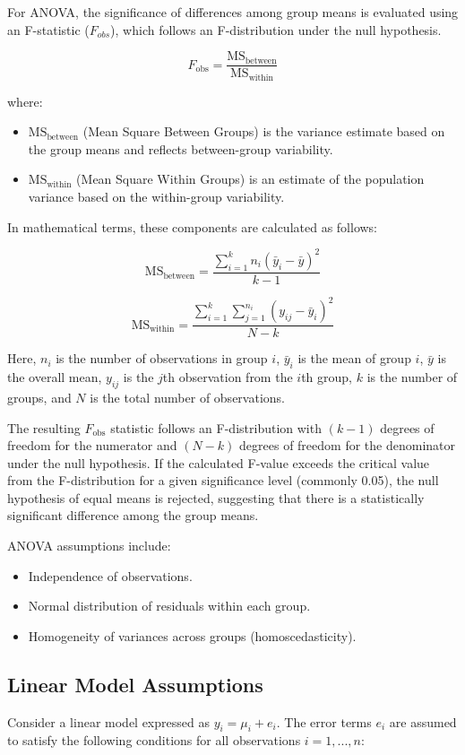 \documentclass{article}
\begin{document}
For ANOVA, the significance of differences among group means is evaluated using an F-statistic ($F_{obs}$), which follows an F-distribution under the null hypothesis.

\[
F_{\text{obs}} = \frac{\text{MS}_{\text{between}}}{\text{MS}_{\text{within}}}
\]

where:
\begin{itemize}
    \item $\text{MS}_{\text{between}}$ (Mean Square Between Groups) is the variance estimate based on the group means and reflects between-group variability.
    \item $\text{MS}_{\text{within}}$ (Mean Square Within Groups) is an estimate of the population variance based on the within-group variability.
\end{itemize}

In mathematical terms, these components are calculated as follows:

\[
\text{MS}_{\text{between}} = \frac{\sum_{i=1}^{k} n_i (\bar{y}_i - \bar{y})^2}{k - 1}
\]

\[
\text{MS}_{\text{within}} = \frac{\sum_{i=1}^{k} \sum_{j=1}^{n_i} (y_{ij} - \bar{y}_i)^2}{N - k}
\]

Here, $n_i$ is the number of observations in group $i$, $\bar{y}_i$ is the mean of group $i$, $\bar{y}$ is the overall mean, $y_{ij}$ is the $j$th observation from the $i$th group, $k$ is the number of groups, and $N$ is the total number of observations.

The resulting $F_{\text{obs}}$ statistic follows an F-distribution with $(k - 1)$ degrees of freedom for the numerator and $(N - k)$ degrees of freedom for the denominator under the null hypothesis. If the calculated F-value exceeds the critical value from the F-distribution for a given significance level (commonly 0.05), the null hypothesis of equal means is rejected, suggesting that there is a statistically significant difference among the group means.

ANOVA assumptions include:
\begin{itemize}
    \item Independence of observations.
    \item Normal distribution of residuals within each group.
    \item Homogeneity of variances across groups (homoscedasticity).
\end{itemize}

\subsection{Linear Model Assumptions}
Consider a linear model expressed as $y_i = \mu_i + e_i$. The error terms $e_i$ are assumed to satisfy the following conditions for all observations $i = 1, ... , n$:
\end{document}

